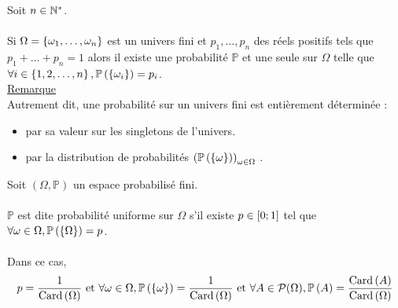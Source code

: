 \begin{defprop}
    Soit \(n \in \mathbb{N}^*\).\\~\\
    Si \(\Omega = \left\lbrace\omega_1, \dots , \omega_n\right\rbrace\) est un univers fini et \(p_1, \dots , p_n\) des réels positifs tels que \(p_1 + \dots + p_n = 1 \) alors il existe une probabilité \(\mathbb{P}\) et une seule sur \(\Omega\) telle que \(\forall i \in \left\lbrace1, 2, \dots , n\right\rbrace , \mathbb{P}\left(\left\lbrace\omega_i\right\rbrace\right) = p_i\).\\

    \underline{Remarque}\\
    Autrement dit, une probabilité sur un univers fini est entièrement déterminée :
    \begin{itemize}
        \item par sa valeur sur les singletons de l’univers.
        \item par la distribution de probabilités \(\left(\mathbb{P}\left(\left\lbrace\omega\right\rbrace\right)\right)_{\omega\in\Omega}\) .
    \end{itemize}
\end{defprop}

\begin{defprop}
    Soit \((\Omega, \mathbb{P})\) un espace probabilisé fini.\\~\\
    \(\mathbb{P}\) est dite probabilité uniforme sur \(\Omega\) s’il existe \(p \in \left[0;1\right]\) tel que \(\forall\omega \in \Omega, \mathbb{P}\left(\left\lbrace\Omega\right\rbrace\right) = p\).\\~\\
    Dans ce cas,
    \[p = \frac{1}{\operatorname{Card}\left(\Omega\right)}\text{ et }\forall\omega \in \Omega, \mathbb{P}\left(\left\lbrace\omega\right\rbrace\right) = \frac{1}{\operatorname{Card}\left(\Omega\right)}\text{ et }\forall A \in \mathcal{P} (\Omega) , \mathbb{P}\left(A\right) = \frac{\operatorname{Card}\left(A\right)}{\operatorname{Card}\left(\Omega\right)} \]
\end{defprop}
